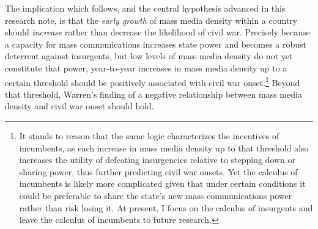 \documentclass[11pt,article,oneside]{memoir}
\begin{document}
The implication which follows, and the central hypothesis advanced in
this research note, is that the \emph{early growth} of mass media
density within a country should \emph{increase} rather than decrease the
likelihood of civil war. Precisely because a capacity for mass
communications increases state power and becomes a robust deterrent
against insurgents, but low levels of mass media density do not yet
constitute that power, year-to-year increases in mass media density up
to a certain threshold should be positively associated with civil war
onset.\footnote{It stands to reason that the same logic characterizes
  the incentives of incumbents, as each increase in mass media density
  up to that threshold also increases the utility of defeating
  insurgencies relative to stepping down or sharing power, thus further
  predicting civil war onsets. Yet the calculus of incumbents is likely
  more complicated given that under certain conditions it could be
  preferable to share the state's new mass communications power rather
  than risk losing it. At present, I focus on the calculus of insurgents
  and leave the calculus of incumbents to future research.} Beyond that
threshold, Warren's finding of a negative relationship between mass
media density and civil war onset should hold.
\end{document}
